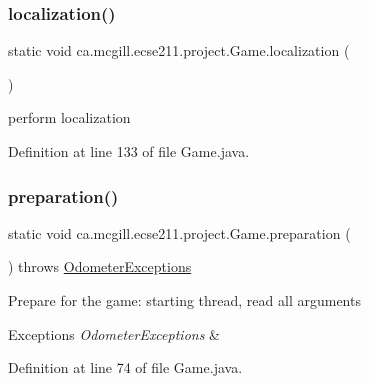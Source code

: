 \subsubsection{\texorpdfstring{localization()}{localization()}}
{\footnotesize\ttfamily static void ca.\+mcgill.\+ecse211.\+project.\+Game.\+localization (\begin{DoxyParamCaption}{ }\end{DoxyParamCaption})\hspace{0.3cm}{\ttfamily [static]}}

perform localization 

Definition at line 133 of file Game.\+java.

\mbox{\label{classca_1_1mcgill_1_1ecse211_1_1project_1_1_game_a1bcbd1c19309c65a6887ae19bde66765}} 
\subsubsection{\texorpdfstring{preparation()}{preparation()}}
{\footnotesize\ttfamily static void ca.\+mcgill.\+ecse211.\+project.\+Game.\+preparation (\begin{DoxyParamCaption}{ }\end{DoxyParamCaption}) throws \hyperlink{classca_1_1mcgill_1_1ecse211_1_1odometer_1_1_odometer_exceptions}{Odometer\+Exceptions}\hspace{0.3cm}{\ttfamily [static]}}

Prepare for the game\+: starting thread, read all arguments


\begin{DoxyExceptions}{Exceptions}
{\em Odometer\+Exceptions} & \\
\hline
\end{DoxyExceptions}


Definition at line 74 of file Game.\+java.

